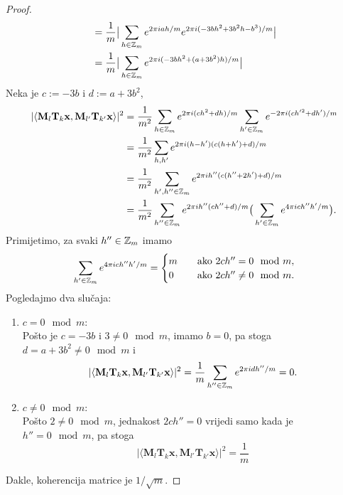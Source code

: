 \documentclass[a4paper,twoside,12pt]{memoir} %
\newcommand{\vect}[1]{\mathbf{#1}}
\renewcommand{\vec}{\vect}
\begin{document}
\begin{proof}
\begin{align*}
        &= \frac{1}{m} \big |   \sum_{h \in \mathbb{Z}_m} e^{2 \pi iah/m}e^{2 \pi i (-3bh^2 + 3b^2h - b^3)/m}  \big | \\
        &= \frac{1}{m} \big |   \sum_{h \in \mathbb{Z}_m} e^{2 \pi i (-3bh^2 + (a+3b^2)h)/m}  \big |
    \end{align*}
    Neka je $c := -3b$ i $d := a + 3b^2$,
    \begin{align*}
        |\langle \vec M_l \vec T_k \vec x, \vec M_{l'} \vec T_{k'} \vec x \rangle|^2 &= \frac{1}{m^2} \sum_{h \in \Z_m} e^{2 \pi i (ch^2 + dh)/m} \sum_{h' \in \Z_m} e^{-2 \pi i (ch'^2 + dh')/m}\\
        &= \frac{1}{m^2} \sum_{h,h'} e^{2 \pi i (h-h')(c(h+h') + d)/m} \\ 
        &= \frac{1}{m^2} \sum_{h',h'' \in \Z_m} e^{2 \pi i h''(c(h''+2h') + d)/m} \\
        &= \frac{1}{m^2} \sum_{h'' \in \Z_m} e^{2 \pi i h''(ch''+d)/m} \big ( \sum_{h' \in \Z_m} e^{4 \pi ich''h'/m} \big).
    \end{align*}
    Primijetimo, za svaki $h'' \in \mathbb{Z}_m$ imamo
    \begin{equation*}
          \sum_{h' \in \mathbb{Z}_m} e^{4 \pi ich''h'/m} =  
          \begin{cases}
              m \quad &\text{ako } 2ch'' = 0 \mod m, \\
              0 \quad &\text{ako } 2ch'' \neq 0 \mod m.
          \end{cases}
    \end{equation*}
    Pogledajmo dva slu\v{c}aja:
    \begin{enumerate}
        \item $c = 0 \mod m$: \\
            Po\v{s}to je $c = -3b$ i $3 \neq 0 \mod m$, imamo $b = 0$, pa stoga $d = a +3b^2 \neq 0 \mod m$ i 
            \begin{equation*}
                |\langle \vec M_l \vec T_k \vec x, \vec M_{l'} \vec T_{k'} \vec x \rangle|^2 = \frac{1}{m} \sum_{h'' \in \Z_m} e^{2 \pi idh''/m} = 0.
            \end{equation*}

        \item $c \neq 0 \mod m$: \\
            Po\v{s}to $2 \neq 0 \mod m$, jednakost $2ch'' = 0$ vrijedi samo kada je $h'' = 0 \mod m$, pa stoga
            \begin{equation*}
                |\langle \vec M_l \vec T_k \vec x, \vec M_{l'} \vec T_{k'} \vec x \rangle|^2 = \frac{1}{m} 
            \end{equation*}
    \end{enumerate}
    Dakle, koherencija matrice je $1/\sqrt{m}$.
\end{proof}
\end{document}
